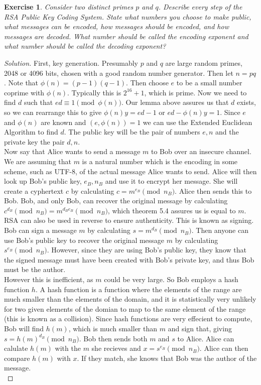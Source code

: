 \documentclass[12pt,leqno]{article}
\numberwithin{equation}{section}
\newtheorem{exer}[thm]{Exercise}
\theoremstyle{definition}
\begin{document}
\begin{exer}
Consider two distinct primes $p$ and $q$. Describe every step of the
RSA Public Key Coding System. State what numbers you choose to make
public, what messages can be encoded, how messages should be
encoded, and how messages are decoded.  What number should be called
the \textit{encoding exponent} and what number should be called the
\textit{decoding exponent}?
\end{exer}
\begin{proof}[Solution]
First, key generation.  Presumably $p$ and $q$ are large random primes, 2048 or 4096 bits, chosen with a good random number generator.  Then let $n = pq$.  Note that $\phi(n) = (p-1)(q-1)$.  Then choose $e$ to be a small number coprime with $\phi(n)$.  Typically this is $2^{16} + 1$, which is prime.  Now we need to find $d$ such that $ed \equiv 1 \pmod{\phi(n)}$.  Our lemma above assures us that $d$ exists, so we can rearrange this to give $\phi(n)y = ed - 1$ or $ed - \phi(n)y = 1$.  Since $e$ and $\phi(n)$ are known and $(e, \phi(n)) = 1$ we can use the Extended Euclidean Algorithm to find $d$.  The public key will be the pair of numbers $e, n$ and the private key the pair $d, n$.\\

Now say that Alice wants to send a message $m$ to Bob over an insecure channel.  We are assuming that $m$ is a natural number which is the encoding in some scheme, such as UTF-8, of the actual message Alice wants to send.  Alice will then look up Bob's public key, $e_B, n_B$ and use it to encrypt her message.  She will create a cyphertext $c$ by calculating $c = m^{e_B} \pmod{n_B}$.  Alice then sends this to Bob.  Bob, and only Bob, can recover the original message by calculating $c^{d_B} \pmod{n_B} = m^{d_Be_B} \pmod{n_B}$, which theorem 5.4 assures us is equal to $m$.\\

RSA can also be used in reverse to ensure authenticity.  This is known as signing.  Bob can sign a message $m$ by calculating $s = m^{d_B} \pmod{n_B}$.  Then anyone can use Bob's public key to recover the original message $m$ by calculating $s^{e_B} \pmod{n_B}$.  However, since they are using Bob's public key, they know that the signed message must have been created with Bob's private key, and thus Bob must be the author.\\
\newpage
However this is inefficient, as $m$ could be very large.  So Bob employs a hash function $h$.  A hash function is a function where the elements of the range are much smaller than the elements of the domain, and it is statistically very unlikely for two given elements of the domian to map to the same element of the range (this is known as a collision).  Since hash functions are very effecient to compute, Bob will find $h(m)$, which is much smaller than $m$ and sign that, giving $s = h(m)^{d_B} \pmod{n_B}$.  Bob then sends both $m$ and $s$ to Alice.  Alice can calulate $h(m)$ with the $m$ she recieves and $x = s^{e_B} \pmod{n_B}$.  Alice can then compare $h(m)$ with $x$.  If they match, she knows that Bob was the author of the message.\\


\end{proof}
\end{document}
